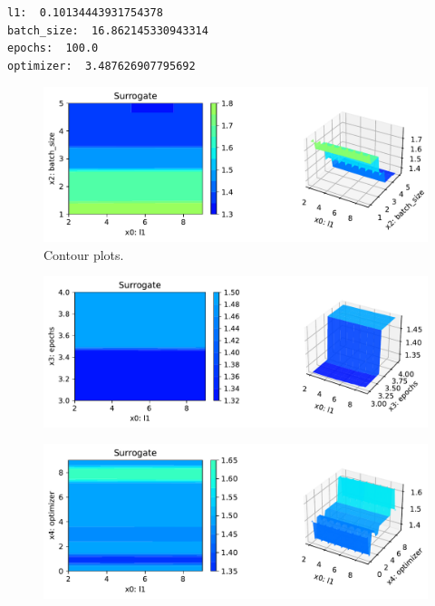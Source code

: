 \documentclass[
  letterpaper,
  DIV=11,
  numbers=noendperiod]{scrreprt}
\begin{document}
\begin{verbatim}
l1:  0.10134443931754378
batch_size:  16.862145330943314
epochs:  100.0
optimizer:  3.487626907795692
\end{verbatim}

\begin{figure}[H]

{\centering \includegraphics{14_spot_ray_hpt_torch_cifar10_files/figure-pdf/cell-32-output-2.pdf}

}

\caption{Contour plots.}

\end{figure}

\begin{figure}[H]

{\centering \includegraphics{14_spot_ray_hpt_torch_cifar10_files/figure-pdf/cell-32-output-3.pdf}

}

\end{figure}

\begin{figure}[H]

{\centering \includegraphics{14_spot_ray_hpt_torch_cifar10_files/figure-pdf/cell-32-output-4.pdf}

}

\end{figure}
\end{document}
